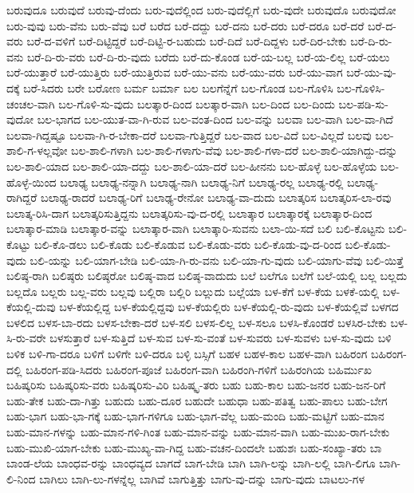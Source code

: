 {ಬರುವುದೂ
ಬರುವುದೆ
ಬರುವು-ದೆಂದು
ಬರು-ವುದೆಲ್ಲಿಂದ
ಬರು-ವುದೆಲ್ಲಿಗೆ
ಬರು-ವುದೇ
ಬರುವುದೊ
ಬರುವುದೋ
ಬರು-ವುವು
ಬರು-ವೆನು
ಬರು-ವೆವು
ಬರೆ
ಬರೆದ
ಬರೆ-ದದ್ದು
ಬರೆ-ದನು
ಬರೆ-ದರು
ಬರೆ-ದರೂ
ಬರೆ-ದರೆ
ಬರೆ-ದ-ವರು
ಬರೆ-ದ-ವಳಿಗೆ
ಬರೆ-ದಿಟ್ಟಿದ್ದರೆ
ಬರೆ-ದಿಟ್ಟಿ-ರ-ಬಹುದು
ಬರೆ-ದಿದೆ
ಬರೆ-ದಿದ್ದಳು
ಬರೆ-ದಿರ-ಬೇಕು
ಬರೆ-ದಿ-ರು-ವನು
ಬರೆ-ದಿ-ರು-ವರು
ಬರೆ-ದಿ-ರು-ವುದು
ಬರೆದು
ಬರೆ-ದು-ಕೊಂಡ
ಬರೆ-ಯ-ಬಲ್ಲ
ಬರೆ-ಯ-ಲಿಲ್ಲ
ಬರೆ-ಯಲು
ಬರೆ-ಯುತ್ತಾರೆ
ಬರೆ-ಯುತ್ತಿರು
ಬರೆ-ಯುತ್ತಿರುವ
ಬರೆ-ಯು-ವನು
ಬರೆ-ಯು-ವರು
ಬರೆ-ಯು-ವಾಗ
ಬರೆ-ಯು-ವು-ದಕ್ಕೆ
ಬರೆ-ಸಿದರು
ಬರೇ
ಬರೋಣ
ಬರ್ಮ
ಬರ್ಮಾ
ಬಲ
ಬಲಗೆನ್ನೆಗೆ
ಬಲ-ಗೊಂಡ
ಬಲ-ಗೊಳಿಸಿ
ಬಲ-ಗೊಳಿಸಿ-ಚಂಚಲ-ವಾಗಿ
ಬಲ-ಗೊಳಿ-ಸು-ವುದು
ಬಲತ್ಕಾರ-ದಿಂದ
ಬಲತ್ಕಾರ-ವಾಗಿ
ಬಲ-ದಿಂದ
ಬಲ-ದಿಂದು
ಬಲ-ಪಡಿ-ಸು-ವುದೋ
ಬಲ-ಭಾಗದ
ಬಲ-ಯುತ-ವಾ-ಗಿ-ರುವ
ಬಲ-ವಂತ-ದಿಂದ
ಬಲ-ವನ್ನು
ಬಲವಾ
ಬಲ-ವಾಗಿ
ಬಲ-ವಾ-ಗಿದೆ
ಬಲವಾ-ಗಿದ್ದಷ್ಟೂ
ಬಲವಾ-ಗಿ-ರ-ಬೇಕಾ-ದರೆ
ಬಲವಾ-ಗುತ್ತಿದ್ದರೆ
ಬಲ-ವಾದ
ಬಲ-ವಿದೆ
ಬಲ-ವಿಲ್ಲದೆ
ಬಲವು
ಬಲ-ಶಾಲಿ-ಗ-ಳಲ್ಲವೋ
ಬಲ-ಶಾಲಿ-ಗಳಾಗಿ
ಬಲ-ಶಾಲಿ-ಗಳಾಗು-ವೆವು
ಬಲ-ಶಾಲಿ-ಗಳಾ-ದರೆ
ಬಲ-ಶಾಲಿ-ಯಾಗಿದ್ದು-ದನ್ನು
ಬಲ-ಶಾಲಿ-ಯಾದ
ಬಲ-ಶಾಲಿ-ಯಾ-ದದ್ದು
ಬಲ-ಶಾಲಿ-ಯಾ-ದರೆ
ಬಲ-ಹೀನನು
ಬಲ-ಹೊಳ್ಳೆ
ಬಲ-ಹೊಳ್ಳೆಯ
ಬಲ-ಹೊಳ್ಳೆ-ಯಿಂದ
ಬಲಾಢ್ಯ
ಬಲಾಢ್ಯ-ನನ್ನಾಗಿ
ಬಲಾಢ್ಯ-ನಾಗಿ
ಬಲಾಢ್ಯ-ನಿಗೆ
ಬಲಾಢ್ಯ-ರಲ್ಲ
ಬಲಾಢ್ಯ-ರಲ್ಲಿ
ಬಲಾಢ್ಯ-ರಾಗಿದ್ದರೆ
ಬಲಾಢ್ಯ-ರಾದರೆ
ಬಲಾಢ್ಯ-ರಿಗೆ
ಬಲಾಢ್ಯ-ರೇನೋ
ಬಲಾಢ್ಯ-ವಾ-ದುದು
ಬಲಾತ್ಕರಿಸ
ಬಲಾತ್ಕರಿಸ-ಲಾ-ರವು
ಬಲಾತ್ಕ-ರಿಸಿ-ದಾಗ
ಬಲಾತ್ಕರಿಸುತ್ತಿದ್ದನು
ಬಲಾತ್ಕರಿಸು-ವು-ದ-ರಲ್ಲಿ
ಬಲಾತ್ಕಾರ
ಬಲಾತ್ಕಾರಕ್ಕೆ
ಬಲಾತ್ಕಾರ-ದಿಂದ
ಬಲಾತ್ಕಾರ-ಮಾಡಿ
ಬಲಾತ್ಕಾರ-ವನ್ನು
ಬಲಾತ್ಕಾರ-ವಾಗಿ
ಬಲಾತ್ಕಾರಿ-ಸುವನು
ಬಲಾ-ಯಿ-ಸದೆ
ಬಲಿ
ಬಲಿ-ಕೊಟ್ಟನು
ಬಲಿ-ಕೊಟ್ಟು
ಬಲಿ-ಕೊ-ಡಲು
ಬಲಿ-ಕೊಡು
ಬಲಿ-ಕೊಡುವ
ಬಲಿ-ಕೊಡು-ವರು
ಬಲಿ-ಕೊಡು-ವು-ದ-ರಿಂದ
ಬಲಿ-ಕೊಡು-ವುದು
ಬಲಿ-ಯನ್ನು
ಬಲಿ-ಯಾಗ-ಬೇಡಿ
ಬಲಿ-ಯಾ-ಗಿ-ರು-ವನು
ಬಲಿ-ಯಾ-ಗು-ವುದು
ಬಲಿ-ಯಾಗು-ವೆವು
ಬಲಿ-ಯಿತ್ತೆ
ಬಲಿಷ್ಠ-ರಾಗಿ
ಬಲಿಷ್ಠರು
ಬಲಿಷ್ಠರೋ
ಬಲಿಷ್ಠ-ವಾದ
ಬಲಿಷ್ಠ-ವಾದುದು
ಬಲೆ
ಬಲೆಗೂ
ಬಲೆಗೆ
ಬಲೆ-ಯಲ್ಲಿ
ಬಲ್ಲ
ಬಲ್ಲದು
ಬಲ್ಲದೊ
ಬಲ್ಲರು
ಬಲ್ಲ-ವರು
ಬಲ್ಲವು
ಬಲ್ಲಿರಾ
ಬಲ್ಲಿರಿ
ಬಲ್ಲುದು
ಬಲ್ಲೆಯಾ
ಬಳ-ಕೆಗೆ
ಬಳ-ಕೆಯ
ಬಳಕೆ-ಯಲ್ಲಿ
ಬಳ-ಕೆಯಲ್ಲಿ-ದುವು
ಬಳ-ಕೆಯಲ್ಲಿದ್ದ
ಬಳ-ಕೆಯಲ್ಲಿದ್ದವು
ಬಳ-ಕೆಯಲ್ಲಿರು
ಬಳ-ಕೆಯಲ್ಲಿ-ರು-ವುದು
ಬಳ-ಕೆಯಲ್ಲಿವೆ
ಬಳಗದ
ಬಳಲಿದ
ಬಳಸ-ಬಾ-ರದು
ಬಳಸ-ಬೇಕಾ-ದರೆ
ಬಳ-ಸಲಿ
ಬಳಸ-ಲಿಲ್ಲ
ಬಳ-ಸಲೂ
ಬಳಸಿ-ಕೊಂಡರೆ
ಬಳಸಿರ-ಬೇಕು
ಬಳ-ಸಿ-ರು-ವರೇ
ಬಳಸುತ್ತಾರೆ
ಬಳ-ಸುತ್ತಿದೆ
ಬಳ-ಸುವ
ಬಳ-ಸು-ವಂತೆ
ಬಳ-ಸುವರು
ಬಳ-ಸುವಳು
ಬಳ-ಸು-ವುದು
ಬಳಿ
ಬಳಿಕ
ಬಳಿ-ಗಾ-ದರೂ
ಬಳಿಗೆ
ಬಳಿಗೇ
ಬಳಿ-ದರೂ
ಬಳ್ಳಿ
ಬಸ್ಸಿಗೆ
ಬಹಳ
ಬಹಳ-ಕಾಲ
ಬಹಳ-ವಾಗಿ
ಬಹಿರಂಗ
ಬಹಿರಂಗ-ದಲ್ಲಿ
ಬಹಿರಂಗ-ಪಡಿ-ಸಿದರು
ಬಹಿರಂಗ-ಪೂಜೆ
ಬಹಿರಂಗ-ವಾಗಿ
ಬಹಿರಂಗಿ-ಗಳಿಗೆ
ಬಹಿರಂಗಿಯ
ಬಹಿರ್ಮುಖ
ಬಹಿಷ್ಕರಿಸು
ಬಹಿಷ್ಕರಿಸು-ವರು
ಬಹಿಷ್ಕರಿಸು-ವಿರಿ
ಬಹಿಷ್ಕೃ-ತರು
ಬಹು
ಬಹು-ಕಾಲ
ಬಹು-ಜನರ
ಬಹು-ಜನ-ರಿಗೆ
ಬಹು-ತೇಕ
ಬಹು-ದಾ-ಗಿತ್ತು
ಬಹುದು
ಬಹು-ದೂರ
ಬಹುದೇ
ಬಹುಧಾ
ಬಹು-ಪತಿತ್ವ
ಬಹು-ಪಾಲು
ಬಹು-ಬೇಗ
ಬಹು-ಭಾಗ
ಬಹು-ಭಾ-ಗಕ್ಕೆ
ಬಹು-ಭಾಗ-ಗಳಿಗೂ
ಬಹು-ಭಾಗ-ವೆಲ್ಲ
ಬಹು-ಮಂದಿ
ಬಹು-ಮಟ್ಟಿಗೆ
ಬಹು-ಮಾನ
ಬಹು-ಮಾನ-ಗಳನ್ನು
ಬಹು-ಮಾನ-ಗಳಿ-ಗಿಂತ
ಬಹು-ಮಾನ-ವನ್ನು
ಬಹು-ಮಾನ-ವಾಗಿ
ಬಹು-ಮುಖ-ರಾಗ-ಬೇಕು
ಬಹು-ಮುಖಿ-ಯಾಗ-ಬೇಕು
ಬಹು-ಮುಖ್ಯ-ವಾ-ಗಿದ್ದ
ಬಹು-ವಚನ-ದಿಂದಲೇ
ಬಹುಶಃ
ಬಹು-ಸಂಖ್ಯಾ-ತರು
ಬಾ
ಬಾಂಡ-ಲೆಯ
ಬಾಂಧವ-ರನ್ನು
ಬಾಂಧವ್ಯದ
ಬಾಗದೆ
ಬಾಗ-ಬೇಡಿ
ಬಾಗಿ
ಬಾಗಿ-ಲನ್ನು
ಬಾಗಿ-ಲಲ್ಲಿ
ಬಾಗಿ-ಲಿಗೂ
ಬಾಗಿ-ಲಿ-ನಿಂದ
ಬಾಗಿಲು
ಬಾಗಿ-ಲು-ಗಳನ್ನೆಲ್ಲ
ಬಾಗಿವೆ
ಬಾಗುತ್ತಿತ್ತು
ಬಾಗು-ವು-ದನ್ನು
ಬಾಗು-ವುದು
ಬಾಟಲು-ಗಳ
}
